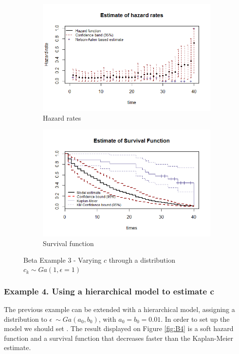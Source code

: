 \documentclass[letterpaper]{article}\usepackage[]{graphicx}\usepackage[]{color}
\begin{document}
\begin{figure}
  \centering
  \begin{subfigure}[a]{\textwidth}\centering
    \includegraphics[width=\textwidth]{B31.png}
    \caption{Hazard rates}
  \end{subfigure}
  \begin{subfigure}[b]{\textwidth}\centering
    \includegraphics[width=\textwidth]{B32.png}
    \caption{Survival function}
  \end{subfigure}
  \caption{Beta Example 3 - Varying $c$ through a distribution $c_k\sim Ga(1,\epsilon = 1)$}
  \label{fig:B3}
\end{figure}

\subsubsection{Example 4. Using a hierarchical model to estimate c}

The previous example can be extended with a hierarchical model, assigning a distribution to $\epsilon ~ \sim Ga(a_0,b_0)$, with $a_0=b_0=0.01$. In order to set up the model we should set . The result displayed on Figure \ref{fig:B4} is a soft hazard function and a survival function that decreases faster than the Kaplan-Meier estimate.
\end{document}
